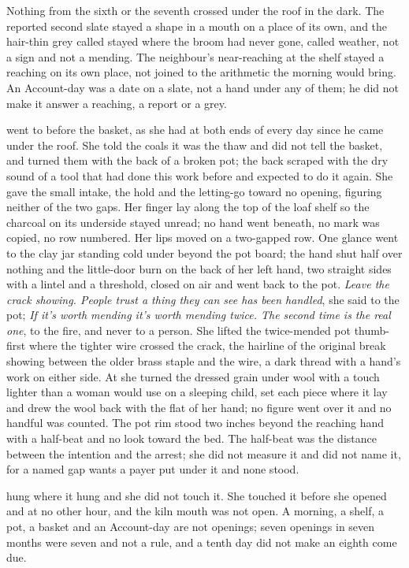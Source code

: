Nothing from the sixth or the seventh crossed under the roof in the dark. The reported second slate stayed a shape in a mouth on a place of its own, and the hair-thin grey called  stayed where the broom had never gone, called weather, not a sign and not a mending. The neighbour's near-reaching at the shelf stayed a reaching on its own place, not joined to the arithmetic the morning would bring. An Account-day was a date on a slate, not a hand under any of them; he did not make it answer a reaching, a report or a grey.

 went to  before the basket, as she had at both ends of every day since he came under the roof. She told the coals it was the thaw and did not tell the basket, and turned them with the back of a broken pot; the back scraped with the dry sound of a tool that had done this work before and expected to do it again. She gave the small intake, the hold and the letting-go toward no opening, figuring neither of the two gaps. Her finger lay along the top of the loaf shelf so the charcoal on its underside stayed unread; no hand went beneath, no mark was copied, no row numbered. Her lips moved on a two-gapped row. One glance went to the clay jar standing cold under  beyond the pot board; the hand shut half over nothing and the little-door burn on the back of her left hand, two straight sides with a lintel and a threshold, closed on air and went back to the pot. \emph{Leave the crack showing. People trust a thing they can see has been handled}, she said to the pot; \emph{If it's worth mending it's worth mending twice. The second time is the real one}, to the fire, and never to a person. She lifted the twice-mended pot thumb-first where the tighter wire crossed the crack, the hairline of the original break showing between the older brass staple and the wire, a dark thread with a hand's work on either side. At  she turned the dressed grain under wool with a touch lighter than a woman would use on a sleeping child, set each piece where it lay and drew the wool back with the flat of her hand; no figure went over it and no handful was counted. The pot rim stood two inches beyond the reaching hand with a half-beat and no look toward the bed. The half-beat was the distance between the intention and the arrest; she did not measure it and did not name it, for a named gap wants a payer put under it and none stood.

 hung where it hung and she did not touch it. She touched it before she opened  and at no other hour, and the kiln mouth was not open. A morning, a shelf, a pot, a basket and an Account-day are not openings; seven openings in seven months were seven and not a rule, and a tenth day did not make an eighth come due.

